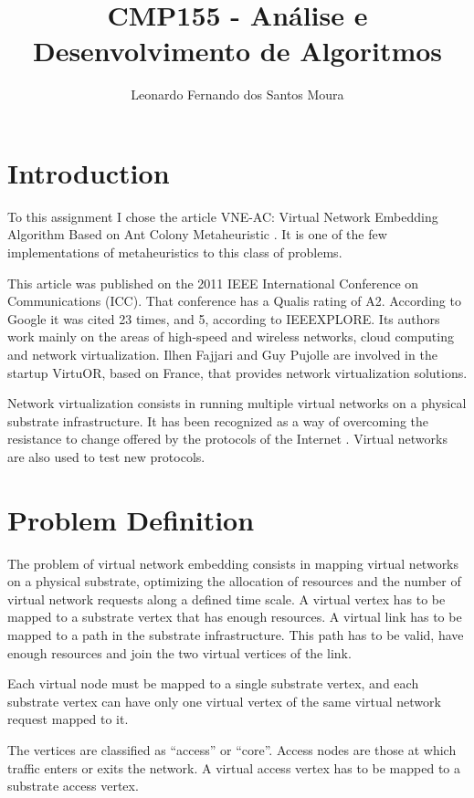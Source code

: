 \documentclass[11pt, a4paper]{article}
\title{CMP155 - An\'{a}lise e Desenvolvimento de Algoritmos}
\author{Leonardo Fernando dos Santos Moura}
\begin{document}
\maketitle

\section{Introduction} 
To this assignment I chose the article VNE-AC: Virtual Network Embedding Algorithm Based on Ant Colony Metaheuristic \cite{fajjari2011}. It is one of the few implementations of metaheuristics to this class of problems.

This article was published on the 2011 IEEE International Conference on Communications (ICC). That conference has a Qualis rating of A2. According to Google it was cited 23 times, and 5, according to IEEEXPLORE.
Its authors work mainly on the areas of high-speed and wireless networks, cloud computing and network virtualization. Ilhen Fajjari and Guy Pujolle are involved in the startup VirtuOR, based on France, that provides network virtualization solutions.

Network virtualization consists in running multiple virtual networks on a physical substrate infrastructure. It has been recognized as a way of overcoming the resistance to change offered by the protocols of the Internet \cite{lu}. Virtual networks are also used to test new protocols.

\section{Problem Definition}
The problem of virtual network embedding consists in mapping virtual networks on a physical substrate, optimizing the allocation of resources and the number of virtual network requests along a defined time scale. A virtual vertex has to be mapped to a substrate vertex that has enough resources. A virtual link has to be mapped to a path in the substrate infrastructure. This path has to be valid, have enough resources and join the two virtual vertices of the link.

Each virtual node must be mapped to a single substrate vertex, and each substrate vertex can have only one virtual vertex of the same virtual network request mapped to it.

The vertices are classified as ``access'' or ``core''. Access nodes are those at which traffic enters or exits the network. A virtual access vertex has to be mapped to a substrate access vertex. 
\end{document}
